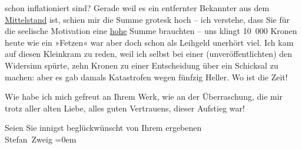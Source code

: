                schon inflationiert sind? Gerade weil es ein entfernter Bekannter aus dem \uline{Mittelstand} ist, schien mir die Summe grotesk hoch –
               ich verstehe, dass {\pb}Sie für die seelische
               Motivation eine \uline{hohe} Summe brauchten – uns klingt
               10 000 Kronen heute wie ein »Fetzen« war aber doch schon als Leihgeld unerhört viel.
               Ich kam auf diesen Kleinkram zu reden, weil ich selbst bei einer (unveröffentlichten)
                  \label{K_L03669-4v}\label{K_L03669-4} den Widersinn spürte, zehn Kronen zu einer Entscheidung über
               ein Schicksal zu machen: aber es gab damals Katastrofen wegen fünfzig Heller. Wo ist
               die Zeit!\pend
           
\pstart
           Wie habe ich mich gefreut an Ihrem Werk, wie an der Überraschung, die mir trotz aller alten
               Liebe, alles guten Vertrauens, dieser Aufstieg war!\pend
           
\pstart
           Seien Sie innigst beglückwünscht von Ihrem ergebenen{\\[\baselineskip]}\spacefill\mbox{Stefan Zweig}\pend
           \leftskip=0em{}\endnumbering{}  \newcommand{\dateiname}{L03669}\newcommand{\titel}{Stefan Zweig an Arthur Schnitzler, 4. 11. 1924}\newcommand{\editorInnen}{Selma Jahnke und Martin Anton Müller}
